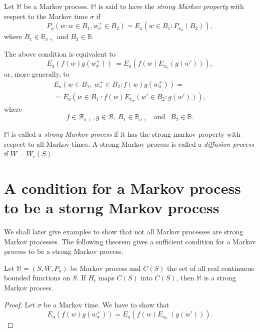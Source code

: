 Let $\mathbb{M}$ be a Markov process. $\mathbb{M}$ is  said to have
 the \textit{strong Markov property} with respect to the Markov time
 $\sigma$ if  
 $$
 P_a ( w: w \in B_1, w^+_\sigma \in B_2 ) = E_a ( w \in B_1 : P_{x_{\sigma}} (B_2)),
 $$ 
 where $B_1 \in \mathbb{B}_{\sigma +}$ and $B_2 \in \mathbb{B}$. 

\begin{remark*}
  The above condition is equivalent to 
  $$
  E_a (f (w)g (w^+_\sigma)) ~ =  E_a (f(w) E_{x_{\sigma}} (g(w'))),
  $$
  or, more generally, to 
  \begin{multline*}
    E_a ( w\in B_1, ~ w^+_\sigma \in B_2 : f (w) g (w^+_\sigma )) =  \\
    = E_a (w \in B_1 ~ : f (w) E_{x_{\sigma}} (w' \in B_2 : g (w'))), 
  \end{multline*}\pageoriginale
  where
  $$
  f \in \mathscr{B}_{\sigma +}, g \in \mathscr{B}, ~ B_1 \in
  \mathbb{B}_{\sigma +}~~ \text{ and } ~~B_2 \in \mathbb{B}. 
  $$
\end{remark*}

\begin{defi*}
  $\mathbb{M}$ is called a  {\em strong Markov process} if it has the
  strong markov property with respect to all Markov times. A strong
  Markov process is called a {\em diffusion process} if $W = W_c (S)$. 
\end{defi*}


\section[A condition for a Markov process...]{A condition for a Markov process to be a storng Markov process}\label{chap2-sec4} 



We shall later give examples to show that not all Markov processes are
strong Markov processes. The following theorem gives a sufficient
condition for a Markov process to be a strong Markov process. 
\begin{theorem*}
Let $\mathbb{M} = ( S,W,P_a )$ be Markov process and $C (S)$ the set
of all real continuous bounded functions on $S$. If $H_t$ maps 
$C(S)$ into $C (S)$, then $\mathbb{M}$ is a strong Markov process. 
\end{theorem*}

\begin{proof}
Let $\sigma$ be a Markov time. We have to show that 
$$
E_a (f (w) g (w^+_\sigma )) = E_a (f (w) E_{x_{\sigma}} ~ (g (w'))).
$$
\end{proof}

